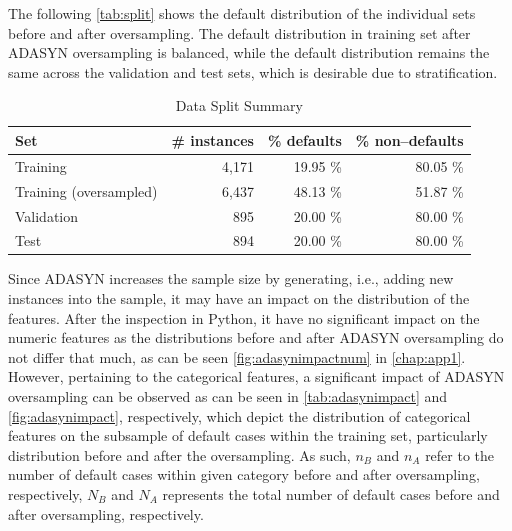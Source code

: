 The following \autoref{tab:split} shows the default distribution of the individual sets before and after oversampling. The default distribution in training set after ADASYN oversampling is balanced, while the default distribution remains the same across the validation and test sets, which is desirable due to stratification.
\begin{table}[H]
\small
\setlength{\tabcolsep}{8pt}
\renewcommand{\arraystretch}{1.3}
\centering
    \caption[Data Split Summary]{Data Split Summary}\label{tab:split}
    \begin{tabular}{lrrr}
\toprule
\textbf{Set} & \textbf{\# instances} & \textbf{\% defaults} & \textbf{\% non--defaults}\\
\midrule
\hline
Training & 4,171  & 19.95 \% & 80.05 \% \\
Training (oversampled) & 6,437 &  48.13 \% & 51.87 \% \\

Validation & 895 &  20.00 \% & 80.00 \% \\

Test & 894 &  20.00 \% & 80.00 \% \\
\hline
\bottomrule
\end{tabular}
\vspace{0.7em}

\vspace{-1em}
\end{table}
\newpage

Since ADASYN increases the sample size by generating, i.e., adding new instances into the sample, it may have an impact on the distribution of the features.
After the inspection in Python, it have no significant impact on the numeric features as the distributions before and after ADASYN oversampling do not differ that much, as can be seen \autoref{fig:adasynimpactnum} in \autoref{chap:app1}.
However, pertaining to the categorical features, a significant impact of ADASYN oversampling can be observed as can be seen in  \autoref{tab:adasynimpact} and \autoref{fig:adasynimpact}, respectively, which depict the distribution of categorical features on the subsample of default cases within the training set, particularly distribution before and after the oversampling.
As such, $n_B$ and $n_A$ refer to the number of default cases within given category before and after oversampling, respectively, $N_B$ and $N_A$ represents the total number of default cases before and after oversampling, respectively.

